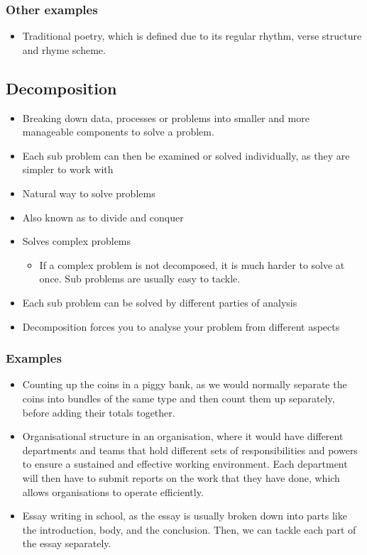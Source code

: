 \documentclass[11pt]{article}
\begin{document}
\subsubsection{Other examples}
\label{sec:orgb629cdf}
\begin{itemize}
\item Traditional poetry, which is defined due to its regular rhythm, verse structure and rhyme scheme.
\end{itemize}

\clearpage
\subsection{Decomposition}
\label{sec:org14effcf}
\begin{itemize}
\item Breaking down data, processes or problems into smaller and more manageable components to solve a problem.
\item Each sub problem can then be examined or solved individually, as they are simpler to work with
\item Natural way to solve problems
\item Also known as to divide and conquer
\item Solves complex problems
\begin{itemize}
\item If a complex problem is not decomposed, it is much harder to solve at once. Sub problems are usually easy to tackle.
\end{itemize}
\item Each sub problem can be solved by different parties of analysis
\item Decomposition forces you to analyse your problem from different aspects
\end{itemize}
\subsubsection{Examples}
\label{sec:orgb4cb613}
\begin{itemize}
\item Counting up the coins in a piggy bank, as we would normally separate the coins into bundles of the same type and then count them up separately, before adding their totals together.
\item Organisational structure in an organisation, where it would have different departments and teams that hold different sets of responsibilities and powers to ensure a sustained and effective working environment. Each department will then have to submit reports on the work that they have done, which allows organisations to operate efficiently.
\item Essay writing in school, as the essay is usually broken down into parts like the introduction, body, and the conclusion. Then, we can tackle each part of the essay separately.
\end{itemize}
\end{document}
